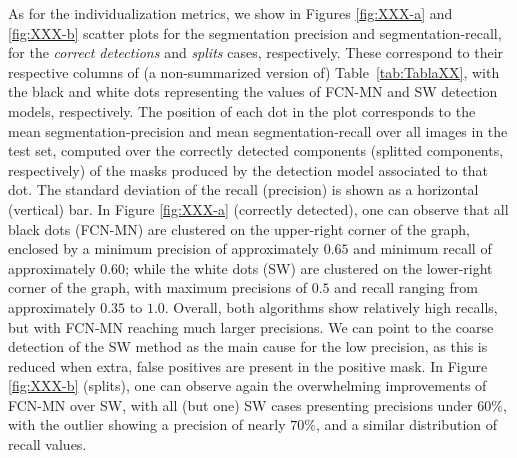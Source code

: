 \documentclass[a4paper,authoryear,review]{elsarticle}
\begin{document}
As for the individualization metrics, we show in Figures \ref{fig:XXX-a} and \ref{fig:XXX-b} scatter plots for the segmentation precision and segmentation-recall, for the \emph{correct detections} and \emph{splits} cases, respectively. These correspond to their respective columns of (a non-summarized version of) Table~\ref{tab:TablaXX}, with the black and white dots representing the values of FCN-MN and SW detection models, respectively. The position of each dot in the plot corresponds to the mean segmentation-precision and mean segmentation-recall over all images in the test set, computed over the correctly detected components (splitted components, respectively) of the masks produced by the detection model associated to that dot. The standard deviation of the recall (precision) is shown as a horizontal (vertical) bar.
%
In Figure \ref{fig:XXX-a} (correctly detected), one can observe that all black dots (FCN-MN) are clustered on the upper-right corner of the graph, enclosed by a minimum precision of approximately $0.65$ and minimum recall of approximately $0.60$; while the white dots (SW) are clustered on the lower-right corner of the graph, with maximum precisions of $0.5$ and recall ranging from approximately $0.35$ to $1.0$. Overall, both algorithms show relatively high recalls, but with FCN-MN reaching much larger precisions. We can point to the coarse detection of the SW method as the main cause for the low precision, as this is reduced when extra, false positives are present in the positive mask. 
%
In Figure \ref{fig:XXX-b} (splits), one can observe again the overwhelming improvements of FCN-MN over SW, with all (but one) SW cases presenting precisions under $60\%$, with the outlier showing a precision of nearly  $70\%$, and a similar distribution of recall values.  
\end{document}
